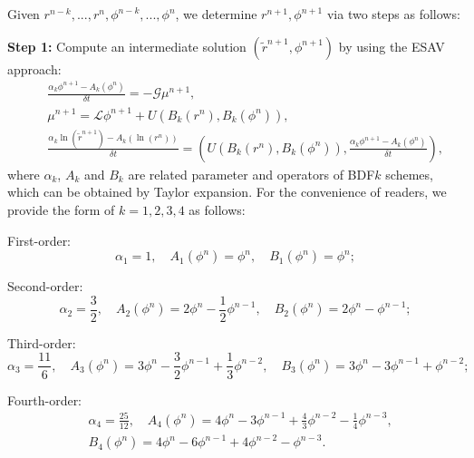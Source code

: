 \documentclass[final,review,onefignum,onetabnum]{siamart190516}
\theoremstyle{plain}
\begin{document}
Given $r^{n-k}, ..., r^{n}, \phi^{n-k}, ..., \phi^{n}$, we determine $r^{n+1}, \phi^{n+1}$ via two steps as follows:

\textbf{Step 1:} Compute an intermediate solution $(\tilde{r}^{n+1}, \phi^{n+1})$ by using  the ESAV approach:
\begin{eqnarray}
\label{eq:R-ESAV1-BDFk-1}
& & \frac{\alpha_{k} \phi^{n+1}-A_{k}\left(\phi^{n}\right)}{\delta t} =-\mathcal{G} \mu^{n+1}, \\
\label{eq:R-ESAV1-BDFk-2}
& & \mu^{n+1} =\mathcal{L} \phi^{n+1}+U\left(B_{k}\left(r^{n}\right), B_{k}\left(\phi^{n}\right)\right), \\ 
\label{eq:R-ESAV1-BDFk-3}
& & \frac{\alpha_{k}\ln(\tilde{r}^{n+1})-A_{k}\left(\ln(r^{n})\right)}{\delta t} =\left(U\left(B_{k}\left(r^{n}\right), B_{k}\left(\phi^{n}\right)\right), \frac{\alpha_{k} \phi^{n+1}-A_{k}\left(\phi^{n}\right)}{\delta t}\right), 
\end{eqnarray}
where $\alpha_{k}$,  $A_{k}$ and $B_{k}$ are related parameter and operators of BDF$k$ schemes, which can  be obtained  by Taylor expansion. For the convenience of readers, we provide the form of $k=1,2,3,4$ as follows:

First-order:
\begin{equation} \label{eq:perameter-BDF1}
	\alpha_{1}=1, \quad A_{1}\left(\phi^{n}\right)=\phi^{n}, \quad B_{1}\left(\phi^{n}\right)=\phi^{n};
\end{equation}
 
Second-order:
\begin{equation}\label{eq:perameter-BDF2}
	\alpha_{2}=\frac{3}{2}, \quad A_{2}\left(\phi^{n}\right)=2 \phi^{n}-\frac{1}{2} \phi^{n-1}, \quad B_{2}\left(\phi^{n}\right)=2 \phi^{n}-\phi^{n-1};
\end{equation}

Third-order:
\begin{equation}\label{eq:perameter-BDF3}
	\alpha_{3}=\frac{11}{6}, \quad A_{3}\left(\phi^{n}\right)=3 \phi^{n}-\frac{3}{2} \phi^{n-1}+\frac{1}{3} \phi^{n-2}, \quad B_{3}\left(\phi^{n}\right)=3 \phi^{n}-3 \phi^{n-1}+\phi^{n-2};
\end{equation}

Fourth-order:
\begin{equation}\label{eq:perameter-BDF4}
	\begin{aligned}
		& \alpha_{4}=\frac{25}{12}, \quad A_{4}\left(\phi^{n}\right)=4 \phi^{n}-3 \phi^{n-1}+\frac{4}{3} \phi^{n-2}-\frac{1}{4} \phi^{n-3}, \\
		& B_{4}\left(\phi^{n}\right)=4 \phi^{n}-6 \phi^{n-1}+4 \phi^{n-2}-\phi^{n-3}.
	\end{aligned}
\end{equation}
\end{document}
